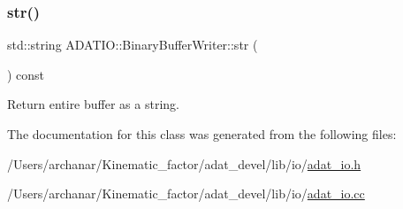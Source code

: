 \subsubsection{\texorpdfstring{str()}{str()}\hspace{0.1cm}{\footnotesize\ttfamily [2/2]}}
{\footnotesize\ttfamily std\+::string A\+D\+A\+T\+I\+O\+::\+Binary\+Buffer\+Writer\+::str (\begin{DoxyParamCaption}{ }\end{DoxyParamCaption}) const}



Return entire buffer as a string. 



The documentation for this class was generated from the following files\+:\begin{DoxyCompactItemize}
\item 
/\+Users/archanar/\+Kinematic\+\_\+factor/adat\+\_\+devel/lib/io/\mbox{\hyperlink{lib_2io_2adat__io_8h}{adat\+\_\+io.\+h}}\item 
/\+Users/archanar/\+Kinematic\+\_\+factor/adat\+\_\+devel/lib/io/\mbox{\hyperlink{adat__io_8cc}{adat\+\_\+io.\+cc}}\end{DoxyCompactItemize}
